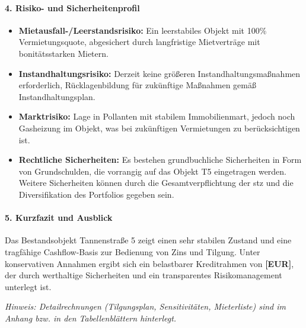 \paragraph{4. Risiko- und Sicherheitenprofil}
\begin{itemize}
	\item \textbf{Mietausfall-/Leerstandsrisiko:} Ein leerstabiles Objekt mit 100\% Vermietungsquote, abgesichert durch langfristige Mietverträge mit bonitätsstarken Mietern.
	\item \textbf{Instandhaltungsrisiko:} Derzeit keine größeren Instandhaltungsmaßnahmen erforderlich, Rücklagenbildung für zukünftige Maßnahmen gemäß Instandhaltungsplan.
	\item \textbf{Marktrisiko:} Lage in Pollanten mit stabilem Immobilienmart, jedoch noch Gasheizung im Objekt, was bei zukünftigen Vermietungen zu berücksichtigen ist.
	\item \textbf{Rechtliche Sicherheiten:} Es bestehen grundbuchliche Sicherheiten in Form von Grundschulden, die vorrangig auf das Objekt T5 eingetragen werden. Weitere Sicherheiten können durch die Gesamtverpflichtung der \gls{stz} und die Diversifikation des Portfolios gegeben sein.
\end{itemize}

\paragraph{5. Kurzfazit und Ausblick}
Das Bestandsobjekt Tannenstraße 5 zeigt einen sehr stabilen Zustand und eine tragfähige Cashflow-Basis zur Bedienung von Zins und Tilgung. Unter konservativen Annahmen ergibt sich ein belastbarer Kreditrahmen von \textbf{[EUR]}, der durch werthaltige Sicherheiten und ein transparentes Risikomanagement unterlegt ist.

\vspace{0.5em}
\textit{Hinweis: Detailrechnungen (Tilgungsplan, Sensitivitäten, Mieterliste) sind im Anhang bzw. in den Tabellenblättern hinterlegt.}

\normalsize
